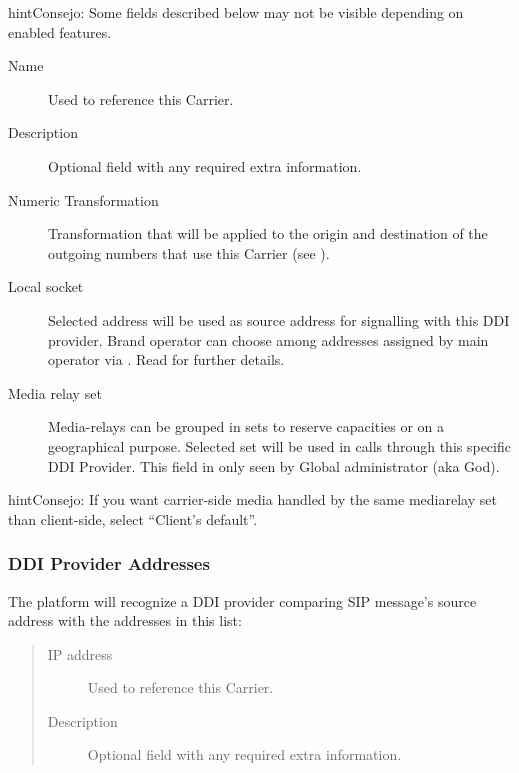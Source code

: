 \documentclass[letterpaper,10pt,spanish]{sphinxmanual}
\begin{document}
\begin{notice}{hint}{Consejo:}
Some fields described below may not be visible depending on enabled features.
\begin{description}
\item[{Name}] \leavevmode
Used to reference this Carrier.

\item[{Description}] \leavevmode
Optional field with any required extra information.

\item[{Numeric Transformation}] \leavevmode
Transformation that will be applied to the origin and destination of the
outgoing numbers that use this Carrier
(see {\hyperref[administration_portal/brand/settings/numeric_transformations:numeric\string-transformations]{}}).

\item[{Local socket}] \leavevmode
Selected address will be used as source address for signalling with this DDI provider. Brand operator can choose among
addresses assigned by main operator via {\hyperref[administration_portal/platform/brands:brands]{}}. Read {\hyperref[administration_portal/platform/infrastructure/proxy_trunks:proxy\string-trunks]{}} for further details.

\item[{Media relay set}] \leavevmode
Media-relays can be grouped in sets to reserve capacities or on a geographical purpose. Selected set will be used
in calls through this specific DDI Provider. This field in only seen by Global administrator (aka God).

\end{description}
\end{notice}

\begin{notice}{hint}{Consejo:}
If you want carrier-side media handled by the same mediarelay set than client-side, select ``Client's default''.
\end{notice}


\subsubsection{DDI Provider Addresses}
\label{administration_portal/brand/providers/ddi_providers:ddi-provider-addresses}
The platform will recognize a DDI provider comparing SIP message's source address with the addresses in this list:
\begin{quote}
\begin{description}
\item[{IP address}] \leavevmode
Used to reference this Carrier.

\item[{Description}] \leavevmode
Optional field with any required extra information.

\end{description}
\end{quote}
\end{document}

